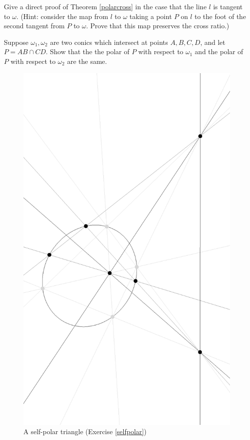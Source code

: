 \begin{exer} Give a direct proof of Theorem \ref{polarcross} in the case that the line $l$ is tangent to $\omega$. (Hint: consider the map from $l$ to $\omega$ taking a point $P$ on $l$ to the foot of the second tangent from $P$ to $\omega$. Prove that this map preserves the cross ratio.)
\end{exer}

\begin{exer} Suppose $\omega_1, \omega_2$ are two conics which intersect at points $A, B, C, D$, and let $P = AB \cap CD$. Show that the the polar of $P$ with respect to $\omega_1$ and the polar of $P$ with respect to $\omega_2$ are the same.
\end{exer}

\begin{figure}[!htb]
\centering
\includegraphics[scale=0.4,angle=270]{selfpolar.eps}
\caption{A self-polar triangle (Exercise \ref{selfpolar})}
\end{figure}

